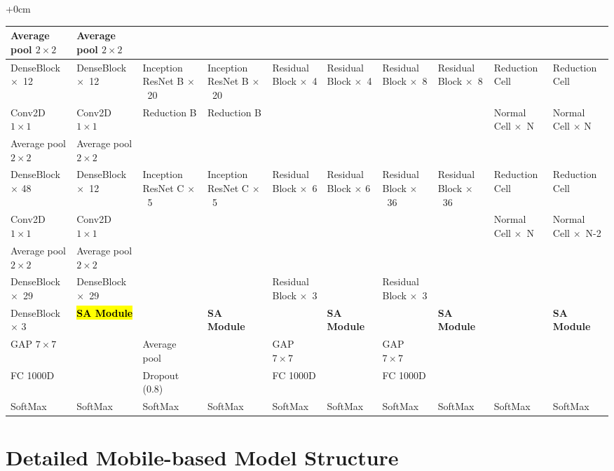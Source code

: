 \documentclass[sensors,article,accept,pdftex,moreauthors]{Definitions/mdpi}
\begin{document}
\begin{adjustwidth}{+\extralength}{0cm}
\begin{table}[H]
\begin{tabularx}{\textwidth}{p{2.2cm}  p{2.2cm}  p{2.2cm}  p{2.6cm}  p{2.2cm}  p{2.2cm}  p{2.2cm}  p{2.2cm}  p{2.4cm}  p{2.6cm}}
	Average pool $2 \times 2$ & Average pool $2 \times 2$ & & & & & & & & \\ \midrule
	DenseBlock $\times$~12 & DenseBlock $\times$~12 & Inception ResNet B $\times$~20& Inception ResNet B $\times$~20& Residual Block $\times$~4& Residual Block $\times$~4& Residual Block $\times$~8& Residual Block $\times$~8& Reduction Cell& Reduction Cell\\ \midrule
	Conv2D $1 \times 1$ & Conv2D $1 \times 1$ & Reduction B & Reduction B & & & & & Normal Cell $\times$~N& Normal Cell $\times$ N\\\midrule
	Average pool $2 \times 2$ & Average pool $2 \times 2$ & & & & & & & & \\ \midrule
	DenseBlock $\times$ 48 & DenseBlock $\times$~12 & Inception ResNet C $\times$~5& Inception ResNet C $\times$~5& Residual Block $\times$~6& Residual Block $\times$ 6& Residual Block $\times$~36& Residual Block $\times$~36& Reduction Cell& Reduction Cell\\ \midrule
	Conv2D $1 \times 1$ & Conv2D $1 \times 1$ & & & & & & & Normal Cell $\times$~N& Normal Cell $\times$~N-2\\\midrule
	Average pool $2 \times 2$ & Average pool $2 \times 2$ & & & & & & & & \\ \midrule
	DenseBlock $\times$~29 & DenseBlock $\times$~29 & & & Residual Block $\times$~3& & Residual Block $\times$~3& & & \\ \midrule
	DenseBlock $\times$ 3 & \textbf{\hl{SA Module} %
} & & \textbf{SA Module}& & \textbf{SA Module}& & \textbf{SA Module}& & \textbf{SA Module}\\	\midrule
	GAP $7 \times 7$ & & Average pool& & GAP $7 \times 7$& & GAP $7 \times 7$& & & \\\midrule
	FC 1000D & & Dropout (0.8)& & FC 1000D& & FC 1000D& & & \\ \midrule
	SoftMax & SoftMax & SoftMax& SoftMax& SoftMax& SoftMax& SoftMax& SoftMax& SoftMax& SoftMax\\ 
	\bottomrule
\end{tabularx}
	\end{table}
	
	\section[\appendixname~\thesection]{Detailed Mobile-based Model Structure}
	

\end{adjustwidth}
\end{document}
